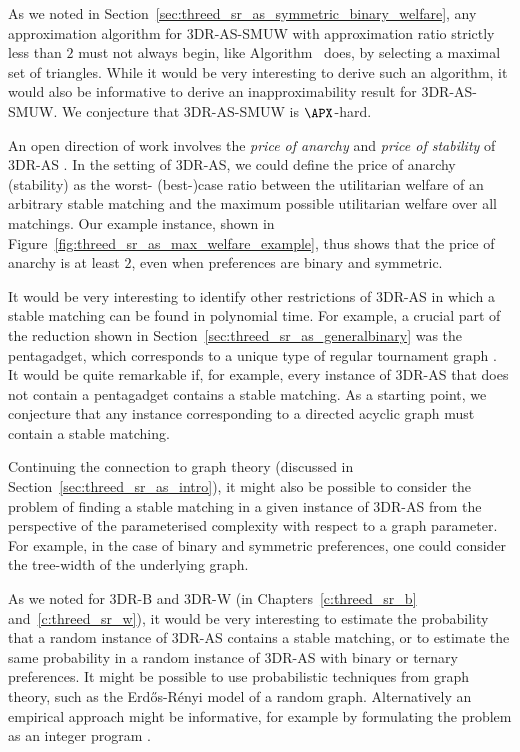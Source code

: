 As we noted in Section~\ref{sec:threed_sr_as_symmetric_binary_welfare}, any approximation algorithm for 3DR-AS-SMUW with approximation ratio strictly less than $2$ must not always begin, like Algorithm~ does, by selecting a maximal set of triangles. While it would be very interesting to derive such an algorithm, it would also be informative to derive an inapproximability result for 3DR-AS-SMUW. We conjecture that 3DR-AS-SMUW is $\APX$-hard.

An open direction of work involves the \emph{price of anarchy} and \emph{price of stability} of 3DR-AS \cite{Bilo22}. In the setting of 3DR-AS, we could define the price of anarchy (stability) as the worst- (best-)case ratio between the utilitarian welfare of an arbitrary stable matching and the maximum possible utilitarian welfare over all matchings. Our example instance, shown in Figure~\ref{fig:threed_sr_as_max_welfare_example}, thus shows that the price of anarchy is at least $2$, even when preferences are binary and symmetric. 

It would be very interesting to identify other restrictions of 3DR-AS in which a stable matching can be found in polynomial time. For example, a crucial part of the reduction shown in Section~\ref{sec:threed_sr_as_generalbinary} was the pentagadget, which corresponds to a unique type of regular tournament graph \cite{McDonald2020}. It would be quite remarkable if, for example, every instance of 3DR-AS that does not contain a pentagadget contains a stable matching. As a starting point, we conjecture that any instance corresponding to a directed acyclic graph must contain a stable matching.

Continuing the connection to graph theory (discussed in Section~\ref{sec:threed_sr_as_intro}), it might also be possible to consider the problem of finding a stable matching in a given instance of 3DR-AS from the perspective of the parameterised complexity with respect to a graph parameter. For example, in the case of binary and symmetric preferences, one could consider the tree-width \cite{Robertson84} of the underlying graph.

As we noted for 3DR-B and 3DR-W (in Chapters~\ref{c:threed_sr_b} and~\ref{c:threed_sr_w}), it would be very interesting to estimate the probability that a random instance of 3DR-AS contains a stable matching, or to estimate the same probability in a random instance of 3DR-AS with binary or ternary preferences. It might be possible to use probabilistic techniques from graph theory, such as the Erd\H{o}s-R\'enyi model of a random graph. Alternatively an empirical approach might be informative, for example by formulating the problem as an integer program \cite{IPbook}.

